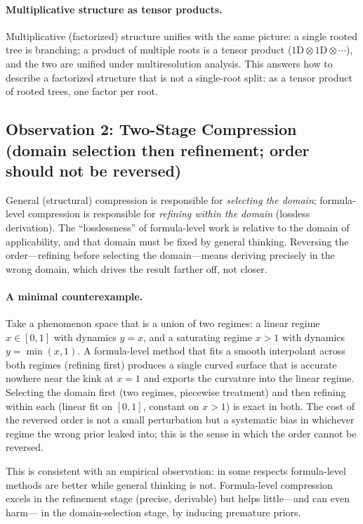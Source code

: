 \documentclass[11pt]{article}
\begin{document}
\paragraph{Multiplicative structure as tensor products.}
Multiplicative (factorized) structure unifies with the same picture: a single
rooted tree is branching; a product of multiple roots is a tensor product
($1\mathrm{D}\otimes1\mathrm{D}\otimes\cdots$), and the two are unified under
multiresolution analysis. This answers how to describe a factorized structure
that is not a single-root split: as a tensor product of rooted trees, one
factor per root.

\subsection{Observation 2: Two-Stage Compression (domain selection then refinement; order should not be reversed)}
\label{sec:twostage}

General (structural) compression is responsible for \emph{selecting the domain};
formula-level compression is responsible for \emph{refining within the domain}
(lossless derivation). The ``losslessness'' of formula-level work is relative to
the domain of applicability, and that domain must be fixed by general thinking.
Reversing the order---refining before selecting the domain---means deriving
precisely in the wrong domain, which drives the result farther off, not closer.

\paragraph{A minimal counterexample.}
Take a phenomenon space that is a union of two regimes: a linear regime
$x\in[0,1]$ with dynamics $y=x$, and a saturating regime $x>1$ with dynamics
$y=\min(x,1)$. A formula-level method that fits a smooth interpolant across both
regimes (refining first) produces a single curved surface that is accurate
nowhere near the kink at $x=1$ and exports the curvature into the linear regime.
Selecting the domain first (two regimes, piecewise treatment) and then refining
within each (linear fit on $[0,1]$, constant on $x>1$) is exact in both. The
cost of the reversed order is not a small perturbation but a systematic bias in
whichever regime the wrong prior leaked into; this is the sense in which the
order cannot be reversed.

This is consistent with an empirical observation: in some respects formula-level
methods
are better while general thinking is not. Formula-level compression excels in
the refinement stage (precise, derivable) but helps little---and can even harm---
in the domain-selection stage, by inducing premature priors.
\end{document}
